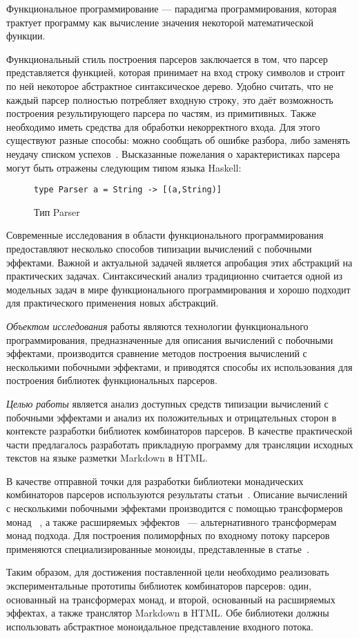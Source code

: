 \Intro

Функциональное программирование --- парадигма программирования, которая трактует
программу как вычисление значения некоторой математической функции.

Функциональный стиль построения парсеров заключается в том, что парсер
представляется функцией, которая принимает на вход строку символов и строит
по ней некоторое абстрактное синтаксическое дерево. Удобно считать, что не каждый
парсер полностью потребляет входную строку, это даёт возможность
построения результирующего парсера по частям, из примитивных. Также необходимо
иметь средства для обработки некорректного входа. Для этого существуют разные
способы: можно сообщать об ошибке разбора, либо заменять неудачу списком
успехов~\cite{wadlerSuccess}. Высказанные пожелания о характеристиках
парсера могут быть отражены следующим типом языка Haskell:

\begin{figure}[h]
\begin{lstlisting}
type Parser a = String -> [(a,String)]
\end{lstlisting}
\caption{Тип Parser}
\end{figure}

Современные исследования в области функционального программирования предоставляют
несколько способов  типизации вычислений с побочными эффектами. Важной и
актуальной задачей является апробация этих абстракций на практических
задачах. Синтаксический анализ традиционно считается одной из модельных
задач в мире функционального программирования и хорошо подходит для практического
применения новых абстракций.

\emph{Объектом исследования} работы являются технологии функционального программирования,
предназначенные для описания вычислений с побочными эффектами, производится
сравнение методов построения вычислений с несколькими побочными эффектами,
и приводятся способы их использования для построения библиотек функциональных
парсеров.

\emph{Целью работы} является анализ доступных средств типизации вычислений с побочными
эффектами и анализ их положительных и отрицательных сторон в контексте
разработки библиотек комбинаторов парсеров. В качестве практической части предлагалось 
разработать прикладную программу для трансляции исходных текстов на языке разметки 
Markdown в HTML.

В качестве отправной точки для разработки библиотеки монадических комбинаторов
парсеров используются результаты статьи~\cite{monParsing}. Описание вычислений
с несколькими побочными эффектами производится с помощью трансформеров монад
~\cite{monadTransformers}, а также расширяемых эффектов~\cite{extEffects} ---
альтернативного трансформерам монад подхода. Для построения полиморфных по
входному потоку парсеров применяются специализированные моноиды, представленные
в статье~\cite{monoids}.

Таким образом, для достижения поставленной цели необходимо реализовать экспериментальные
прототипы библиотек комбинаторов парсеров: один, основанный на
трансформерах монад, и второй, основанный на расширяемых эффектах, а также 
транслятор Markdown в HTML. Обе библиотеки должны использовать абстрактное 
моноидальное представление входного потока.
